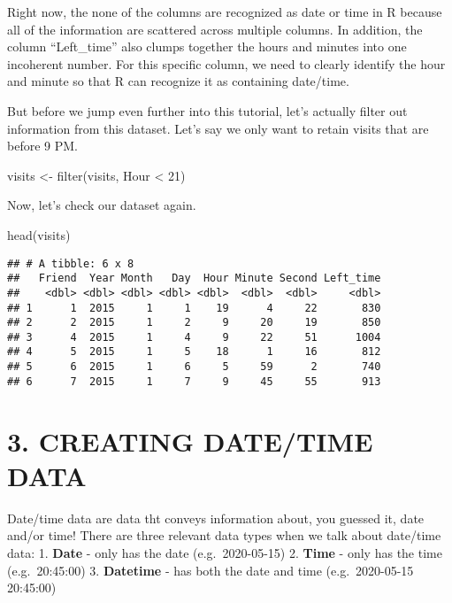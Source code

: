 \documentclass[
]{book}
\newenvironment{Shaded}{\begin{snugshade}}{\end{snugshade}}
\newcommand{\DecValTok}[1]{\textcolor[rgb]{0.00,0.00,0.81}{#1}}
\newcommand{\FunctionTok}[1]{\textcolor[rgb]{0.00,0.00,0.00}{#1}}
\newcommand{\NormalTok}[1]{#1}
\newcommand{\OtherTok}[1]{\textcolor[rgb]{0.56,0.35,0.01}{#1}}
\newcommand{\SpecialCharTok}[1]{\textcolor[rgb]{0.00,0.00,0.00}{#1}}
\begin{document}
Right now, the none of the columns are recognized as date or time in R because all of the information are scattered across multiple columns. In addition, the column ``Left\_time'' also clumps together the hours and minutes into one incoherent number. For this specific column, we need to clearly identify the hour and minute so that R can recognize it as containing date/time.

But before we jump even further into this tutorial, let's actually filter out information from this dataset. Let's say we only want to retain visits that are before 9 PM.

\begin{Shaded}
\begin{Highlighting}[]
\NormalTok{visits }\OtherTok{\textless{}{-}} \FunctionTok{filter}\NormalTok{(visits, Hour }\SpecialCharTok{\textless{}} \DecValTok{21}\NormalTok{)}
\end{Highlighting}
\end{Shaded}

Now, let's check our dataset again.

\begin{Shaded}
\begin{Highlighting}[]
\FunctionTok{head}\NormalTok{(visits)}
\end{Highlighting}
\end{Shaded}

\begin{verbatim}
## # A tibble: 6 x 8
##   Friend  Year Month   Day  Hour Minute Second Left_time
##    <dbl> <dbl> <dbl> <dbl> <dbl>  <dbl>  <dbl>     <dbl>
## 1      1  2015     1     1    19      4     22       830
## 2      2  2015     1     2     9     20     19       850
## 3      4  2015     1     4     9     22     51      1004
## 4      5  2015     1     5    18      1     16       812
## 5      6  2015     1     6     5     59      2       740
## 6      7  2015     1     7     9     45     55       913
\end{verbatim}

\hypertarget{creating-datetime-data}{%
\section{3. CREATING DATE/TIME DATA}\label{creating-datetime-data}}

Date/time data are data tht conveys information about, you guessed it, date and/or time! There are three relevant data types when we talk about date/time data:
1. \textbf{Date} - only has the date (e.g.~2020-05-15)
2. \textbf{Time} - only has the time (e.g.~20:45:00)
3. \textbf{Datetime} - has both the date and time (e.g.~2020-05-15 20:45:00)
\end{document}
